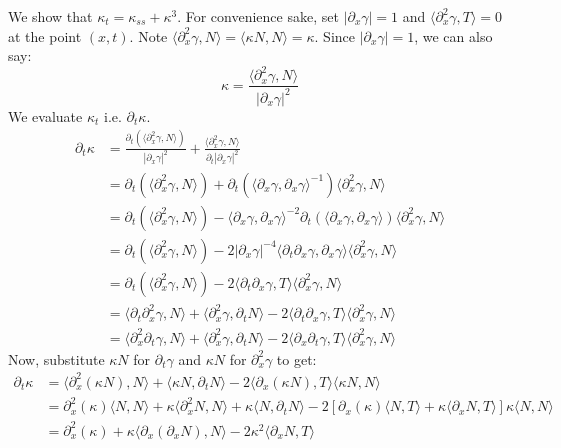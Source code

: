 \documentclass{article}
\begin{document}
We show that $\kappa_t = \kappa_{ss} + \kappa^3$. For convenience sake, set $|\partial_x \gamma| = 1$ and $\langle \partial_x^2 \gamma, T\rangle = 0$ at the point $(x,t)$.
Note $\langle \partial_x^2 \gamma, N\rangle = \langle \kappa N, N\rangle = \kappa$. Since $|\partial_x \gamma| = 1$, we can also say:
\[ \kappa = \frac{\langle \partial_x^2 \gamma, N\rangle}{|\partial_x \gamma|^2} \]
We evaluate $\kappa_t$ i.e. $\partial_t \kappa$.
\begin{align*}
	\partial_t \kappa &= \frac{\partial_t(\langle \partial_x^2 \gamma, N\rangle)}{|\partial_x \gamma|^2} + \frac{\langle \partial_x^2 \gamma, N\rangle}{\partial_t  |\partial_x \gamma|^2} \\
		&= \partial_t(\langle \partial_x^2 \gamma, N\rangle) + \partial_t (\langle \partial_x \gamma, \partial_x \gamma\rangle^{-1})\langle \partial_x^2 \gamma, N\rangle \\
		&= \partial_t(\langle \partial_x^2 \gamma, N\rangle) - \langle \partial_x \gamma, \partial_x \gamma\rangle^{-2}\partial_t (\langle \partial_x\gamma, \partial_x\gamma\rangle) \langle \partial_x^2 \gamma, N\rangle \\
		&= \partial_t(\langle \partial_x^2 \gamma, N\rangle) - 2|\partial_x \gamma|^{-4}\langle \partial_t \partial_x\gamma, \partial_x\gamma\rangle \langle \partial_x^2 \gamma, N\rangle \\
		&= \partial_t(\langle \partial_x^2 \gamma, N\rangle) - 2\langle \partial_t \partial_x\gamma, T\rangle \langle \partial_x^2 \gamma, N\rangle \\
		&= \langle \partial_t \partial_x^2 \gamma, N\rangle + \langle \partial_x^2 \gamma, \partial_t N\rangle - 2\langle \partial_t \partial_x\gamma, T\rangle \langle \partial_x^2 \gamma, N\rangle \\
		&= \langle \partial_x^2 \partial_t \gamma, N\rangle + \langle \partial_x^2 \gamma, \partial_t N\rangle - 2\langle \partial_x \partial_t\gamma, T\rangle \langle \partial_x^2 \gamma, N\rangle
\end{align*}
Now, substitute $\kappa N$ for $\partial_t \gamma$ and $\kappa N$ for $\partial_x^2 \gamma$ to get:
\begin{align*}
	\partial_t \kappa &= \langle \partial_x^2 (\kappa N), N\rangle + \langle \kappa N, \partial_t N\rangle - 2\langle \partial_x (\kappa N), T\rangle \langle \kappa N, N\rangle \\
		&= \partial_x^2 (\kappa)\langle N, N\rangle + \kappa\langle \partial_x^2 N, N\rangle + \kappa\langle N, \partial_t N\rangle - 2[\partial_x (\kappa)\langle N, T\rangle + 
			\kappa\langle \partial_x N, T\rangle]\kappa\langle N, N\rangle \\
		&= \partial_x^2 (\kappa) + \kappa\langle \partial_x(\partial_x N), N\rangle - 2\kappa^2\langle \partial_x N, T\rangle
\end{align*}
\end{document}
